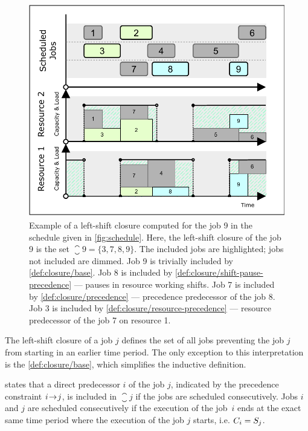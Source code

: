 \begin{figure}[t]
    \centering
    \includegraphics[width=\textwidth]{img/Schedule-Closure.pdf}
    \caption{
        Example of a left-shift closure computed for the job 9 in the schedule given in \cref{fig:schedule}.
        Here, the left-shift closure of the job 9 is the set $\closure{9} = \{ 3, 7, 8, 9 \}$.
        The included jobs are highlighted; jobs not included are dimmed.
        Job 9 is trivially included by \cref{def:closure/base}.
        Job 8 is included by \cref{def:closure/shift-pause-precedence} --- pauses in resource working shifts.
        Job 7 is included by \cref{def:closure/precedence} --- precedence predecessor of the job 8.
        Job 3 is included by \cref{def:closure/resource-precedence} --- resource predecessor of the job 7 on resource 1.
        }
    \label{fig:schedule-closure}
\end{figure}

The left-shift closure of a job $j$ defines the set of all jobs
preventing the job $j$ from starting in an earlier time period.
The only exception to this interpretation is the \cref{def:closure/base},
which simplifies the inductive definition.

 states that a direct predecessor $i$ of the job $j$,
indicated by the precedence constraint $i \hspace{-0.2em} \rightarrow \hspace{-0.2em} j$,
is included in $\closure{j}$ if the jobs are scheduled consecutively.
Jobs $i$ and $j$ are scheduled consecutively if the execution of the job~$i$ ends
at the exact same time period where the execution of the job $j$ starts,
i.e. $C_{i} = S_{j}$.

